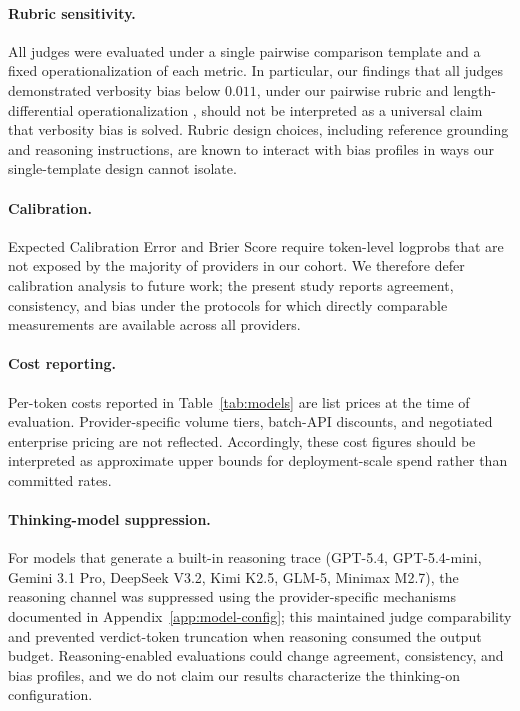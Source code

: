 \documentclass[11pt]{article}
\begin{document}
\paragraph{Rubric sensitivity.} All judges were evaluated under a
single pairwise comparison template and a fixed operationalization of
each metric. In particular, our findings that all judges demonstrated verbosity bias below $0.011$, under our pairwise rubric and length-differential
operationalization \citep{wu2023style,dubois2024alpacaeval}, should
not be interpreted as a universal claim that verbosity bias is solved.
Rubric design choices, including reference grounding and reasoning
instructions, are known to interact with bias profiles in ways our
single-template design cannot isolate.

\paragraph{Calibration.} Expected Calibration Error and Brier Score
require token-level logprobs that are not exposed by the majority of providers
in our cohort. We therefore defer calibration analysis to future
work; the present study reports agreement, consistency, and bias
under the protocols for which directly comparable measurements are
available across all providers.

\paragraph{Cost reporting.} Per-token costs reported in
Table~\ref{tab:models} are list prices at the time of evaluation.
Provider-specific volume tiers, batch-API discounts, and negotiated
enterprise pricing are not reflected. Accordingly, these cost figures should be
interpreted as approximate upper bounds for deployment-scale spend rather than committed rates.

\paragraph{Thinking-model suppression.} For models that generate a
built-in reasoning trace (GPT-5.4, GPT-5.4-mini, Gemini 3.1 Pro,
DeepSeek V3.2, Kimi K2.5, GLM-5, Minimax M2.7), the reasoning channel
was suppressed using the provider-specific mechanisms documented in
Appendix~\ref{app:model-config}; this maintained judge comparability
and prevented verdict-token truncation when reasoning consumed the
output budget. Reasoning-enabled evaluations could change agreement,
consistency, and bias profiles, and we do not claim our results
characterize the thinking-on configuration.
\end{document}
